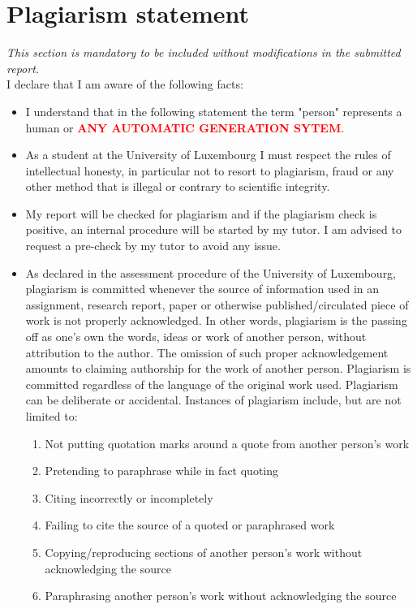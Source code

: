 \documentclass[conference,compsoc]{IEEEtran}
\begin{document}
\section*{Plagiarism statement}
 {\it This section is mandatory to be included without modifications in the submitted report.}\\

I declare that I am aware of the following facts:
\begin{itemize}
	\item I understand that in the following statement the term "person" represents a human or \textbf{\textcolor{red}{ANY AUTOMATIC GENERATION SYTEM}}.
	\item As a student at the University of Luxembourg I must respect the rules of intellectual honesty, in particular not to resort to plagiarism, fraud or any other method that is illegal or contrary to scientific integrity.
	\item My report will be checked for plagiarism and if the plagiarism check is positive, an internal procedure will be started by my tutor. I am advised to request a pre-check by my tutor to avoid any issue.
	\item As declared in the assessment procedure of the University of Luxembourg, plagiarism is committed whenever the source of information used in an assignment, research report, paper or otherwise published/circulated piece of work is not properly acknowledged. In other words, plagiarism is the passing off as one’s own the words, ideas or work of another person, without attribution to the author. The omission of such proper acknowledgement amounts to claiming authorship for the work of another person. Plagiarism is committed regardless of the language of the original work used. Plagiarism can be deliberate or accidental.
	      Instances of plagiarism include, but are not limited to:
	      \begin{enumerate}
		      \item Not putting quotation marks around a quote from another person’s work
		      \item Pretending to paraphrase while in fact quoting
		      \item Citing incorrectly or incompletely
		      \item Failing to cite the source of a quoted or paraphrased work
		      \item Copying/reproducing sections of another person’s work without acknowledging the source
		      \item Paraphrasing another person’s work without acknowledging the source

\end{enumerate}
\end{itemize}
\end{document}
